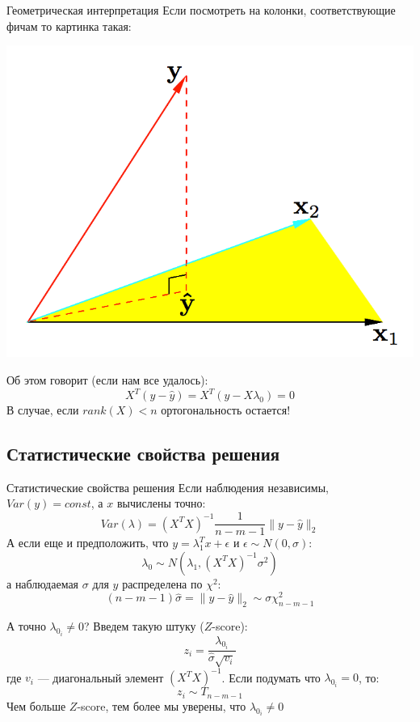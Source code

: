 \documentclass[14pt, fleqn, xcolor={dvipsnames, table}]{beamer}
\begin{document}
\begin{frame}{Геометрическая интерпретация}
Если посмотреть на колонки, соответствующие фичам то картинка такая:
\begin{center}
\includegraphics[height=0.5\textheight]{3_2.png}
\end{center}
Об этом говорит (если нам все удалось):
$$
X^T(y - \hat{y}) = X^T(y - X\lambda_0) = 0
$$
В случае, если $rank(X) < n$ ортогональность остается!
\end{frame}

\subsection{Статистические свойства решения}
\begin{frame}{Статистические свойства решения}
Если наблюдения независимы, $Var(y) = const$, а $x$ вычислены точно:
$$
Var(\lambda) = \left(X^TX\right)^{-1}\frac{1}{n - m - 1}\|y - \hat{y}\|_2
$$
А если еще и предположить, что $y=\lambda_1^Tx + \epsilon$ и $\epsilon \sim N(0,\sigma)$:
$$
\lambda_0 \sim N(\lambda_1, \left(X^TX\right)^{-1}\sigma^2)
$$
а наблюдаемая $\sigma$ для $y$ распределена по $\chi^2$:
$$
(n-m-1)\hat{\sigma} = \|y - \hat{y}\|_2 \sim \sigma \chi^2_{n-m-1}
$$
\end{frame}

\begin{frame}{А точно $\lambda_{0_i} \ne 0$?}
Введем такую штуку ($Z$-score):
$$
z_i = \frac{\lambda_{0_i}}{\hat{\sigma}\sqrt{v_i}}
$$
где $v_i$ --- диагональный элемент $\left(X^TX\right)^{-1}$. Если подумать что $\lambda_{0_i} = 0$, то:
$$
z_i \sim T_{n-m-1}
$$
Чем больше $Z$-score, тем более мы уверены, что $\lambda_{0_i} \ne 0$
\end{frame}
\end{document}
